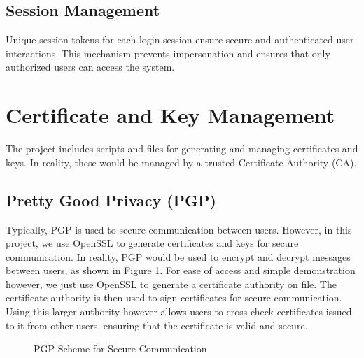 \documentclass[12pt]{article}
\begin{document}
\subsection{Session Management}
Unique session tokens for each login session ensure secure and authenticated user interactions. This mechanism prevents impersonation and ensures that only authorized users can access the system.

\newpage

\section{Certificate and Key Management}
The project includes scripts and files for generating and managing certificates and keys. In reality, these would be managed by a trusted Certificate Authority (CA).

\subsection{Pretty Good Privacy (PGP)}
Typically, PGP is used to secure communication between users. However, in this project, we use OpenSSL to generate certificates and keys for secure communication.
In reality, PGP would be used to encrypt and decrypt messages between users, as shown in Figure \ref{fig:pgp_scheme}.
For ease of access and simple demonstration however, we just use OpenSSL to generate a certificate authority on file. The certificate authority is then used to sign certificates for secure communication.
Using this larger authority however allows users to cross check certificates issued to it from other users, ensuring that the certificate is valid and secure.

\begin{figure}[h]
    \centering
    \caption{PGP Scheme for Secure Communication}
    \label{fig:pgp_scheme}
\end{figure}
\end{document}
